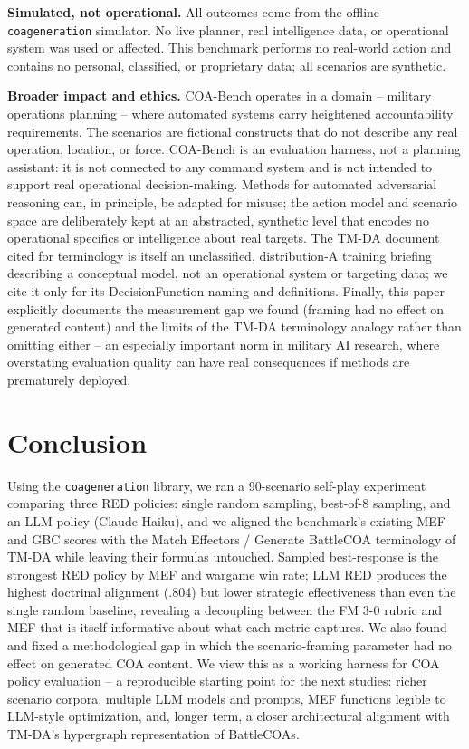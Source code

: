\documentclass[sigconf]{acmart}
\begin{document}
\textbf{Simulated, not operational.} All outcomes come from the offline \texttt{coageneration} simulator. No live planner, real intelligence data, or operational system was used or affected. This benchmark performs no real-world action and contains no personal, classified, or proprietary data; all scenarios are synthetic.

\textbf{Broader impact and ethics.} COA-Bench operates in a domain -- military operations planning -- where automated systems carry heightened accountability requirements. The scenarios are fictional constructs that do not describe any real operation, location, or force. COA-Bench is an evaluation harness, not a planning assistant: it is not connected to any command system and is not intended to support real operational decision-making. Methods for automated adversarial reasoning can, in principle, be adapted for misuse; the action model and scenario space are deliberately kept at an abstracted, synthetic level that encodes no operational specifics or intelligence about real targets. The TM-DA document cited for terminology is itself an unclassified, distribution-A training briefing describing a conceptual model, not an operational system or targeting data; we cite it only for its DecisionFunction naming and definitions. Finally, this paper explicitly documents the measurement gap we found (framing had no effect on generated content) and the limits of the TM-DA terminology analogy rather than omitting either -- an especially important norm in military AI research, where overstating evaluation quality can have real consequences if methods are prematurely deployed.

\section{Conclusion}

Using the \texttt{coageneration} library, we ran a 90-scenario self-play experiment comparing three RED policies: single random sampling, best-of-8 sampling, and an LLM policy (Claude Haiku), and we aligned the benchmark's existing MEF and GBC scores with the Match Effectors / Generate BattleCOA terminology of TM-DA while leaving their formulas untouched. Sampled best-response is the strongest RED policy by MEF and wargame win rate; LLM RED produces the highest doctrinal alignment (.804) but lower strategic effectiveness than even the single random baseline, revealing a decoupling between the FM 3-0 rubric and MEF that is itself informative about what each metric captures. We also found and fixed a methodological gap in which the scenario-framing parameter had no effect on generated COA content. We view this as a working harness for COA policy evaluation -- a reproducible starting point for the next studies: richer scenario corpora, multiple LLM models and prompts, MEF functions legible to LLM-style optimization, and, longer term, a closer architectural alignment with TM-DA's hypergraph representation of BattleCOAs.
\end{document}
